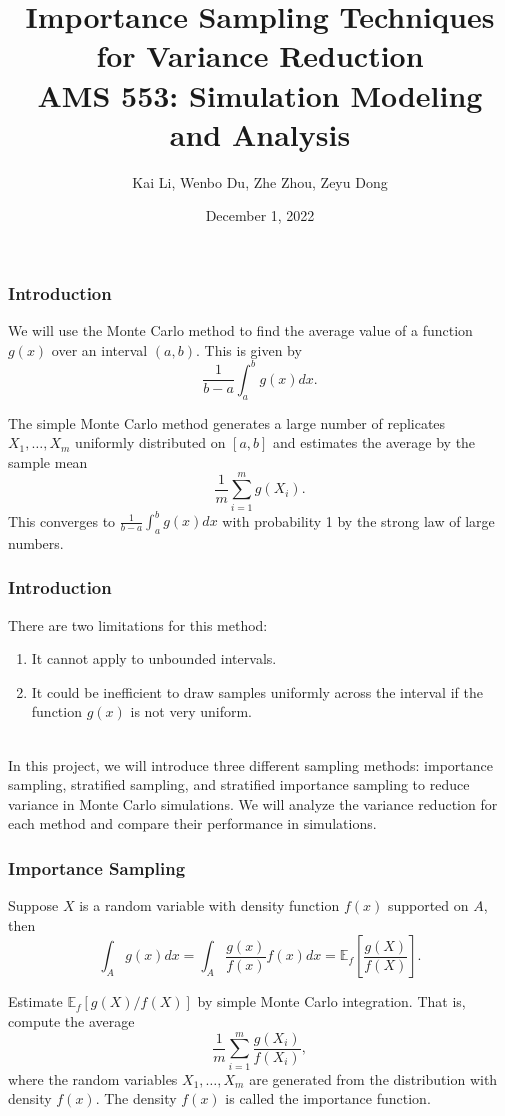 \documentclass{beamer}
\date{December 1, 2022}
\title[Importance Sampling Techniques]{Importance Sampling Techniques for Variance Reduction\\[1ex]\normalsize AMS 553: Simulation Modeling and Analysis}
\author[Kai Li, Wenbo Du , Zhe Zhou, Zeyu Dong]{Kai Li, Wenbo Du, Zhe Zhou, Zeyu Dong}
\institute[]{Applied Mathematics and Statistics, Stony Brook University}
\begin{document}
\frame{\titlepage}

\begin{frame}[fragile]
\frametitle{Introduction}

We will use the Monte Carlo method to find the average value of a function $g(x)$ over an interval $(a, b)$. This is given by
\[
\frac{1}{b-a} \int_{a}^{b} g(x) dx.
\]

The simple Monte Carlo method generates a large number of replicates $X_{1}, \ldots, X_{m}$ uniformly distributed on $[a, b]$ and estimates the average by the sample mean
\[
\frac{1}{m}\sum_{i=1}^{m} g(X_{i}).
\]
This converges to $\frac{1}{b-a}\int_{a}^{b} g(x) dx$ with probability 1 by the strong law of large numbers. 
\end{frame}

\begin{frame}[fragile]
\frametitle{Introduction}

There are two limitations for this method:
\begin{enumerate}
\item It cannot apply to unbounded intervals.
\item It could be inefficient to draw samples uniformly across the interval if the function $g(x)$ is not very uniform.\\~\
\end{enumerate}

In this project, we will introduce three different sampling methods: importance sampling, stratified sampling, and stratified importance sampling to reduce variance in Monte Carlo simulations. We will analyze the variance reduction for each method and compare their performance in simulations.
\end{frame}

\begin{frame}[fragile]
\frametitle{Importance Sampling}

Suppose $X$ is a random variable with density function $f(x)$ supported on $A$, then
\[
\int_A g(x) dx = \int_A \frac{g(x)}{f(x)} f(x) dx = \mathbb{E}_f\left[\frac{g(X)}{f(X)}\right].
\]

Estimate $\mathbb{E}_f[g(X)/f(X)]$ by simple Monte Carlo integration. That is, compute the average
\[
\frac{1}{m} \sum_{i=1}^{m} \frac{g\left(X_{i}\right)}{f\left(X_{i}\right)},
\]
where the random variables $X_{1}, \ldots, X_{m}$ are generated from the distribution with density $f(x)$. The density $f(x)$ is called the importance function.
\end{frame}
\end{document}
